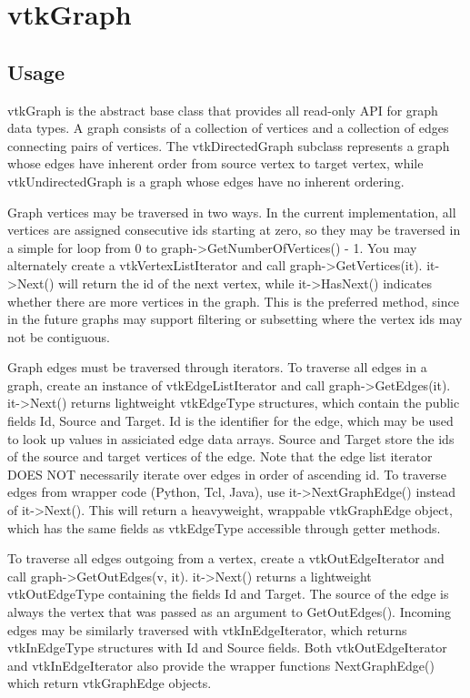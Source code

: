 \section{vtkGraph}

\subsection{Usage}

 vtkGraph is the abstract base class that provides all read-only API for graph
 data types. A graph consists of a collection of vertices and a
 collection of edges connecting pairs of vertices. The vtkDirectedGraph
 subclass represents a graph whose edges have inherent order from source
 vertex to target vertex, while vtkUndirectedGraph is a graph whose edges
 have no inherent ordering.

 Graph vertices may be traversed in two ways. In the current implementation,
 all vertices are assigned consecutive ids starting at zero, so they may
 be traversed in a simple for loop from 0 to graph->GetNumberOfVertices() - 1.
 You may alternately create a vtkVertexListIterator and call graph->GetVertices(it).
 it->Next() will return the id of the next vertex, while it->HasNext() indicates
 whether there are more vertices in the graph.
 This is the preferred method, since in the future graphs may support filtering
 or subsetting where the vertex ids may not be contiguous.

 Graph edges must be traversed through iterators. To traverse all edges
 in a graph, create an instance of vtkEdgeListIterator and call graph->GetEdges(it).
 it->Next() returns lightweight vtkEdgeType structures, which contain the public
 fields Id, Source and Target. Id is the identifier for the edge, which may
 be used to look up values in assiciated edge data arrays. Source and Target
 store the ids of the source and target vertices of the edge. Note that the
 edge list iterator DOES NOT necessarily iterate over edges in order of ascending
 id. To traverse edges from wrapper code (Python, Tcl, Java), use
 it->NextGraphEdge() instead of it->Next().  This will return a heavyweight,
 wrappable vtkGraphEdge object, which has the same fields as vtkEdgeType
 accessible through getter methods.

 To traverse all edges outgoing from a vertex, create a vtkOutEdgeIterator and
 call graph->GetOutEdges(v, it). it->Next() returns a lightweight vtkOutEdgeType
 containing the fields Id and Target. The source of the edge is always the
 vertex that was passed as an argument to GetOutEdges().
 Incoming edges may be similarly traversed with vtkInEdgeIterator, which returns
 vtkInEdgeType structures with Id and Source fields.
 Both vtkOutEdgeIterator and vtkInEdgeIterator also provide the wrapper functions
 NextGraphEdge() which return vtkGraphEdge objects.

